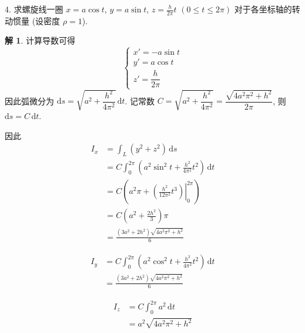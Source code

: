 \documentclass[a4paper,12pt]{article}
\theoremstyle{definition}
\newtheorem*{sol}{解}
\begin{document}
4. 求螺旋线一圈 $x = a\cos t$, $y = a\sin t$, $z = \frac{h}{2\pi}t$ $(0 \leq t \leq 2\pi)$ 对于各坐标轴的转动惯量 (设密度 $\rho = 1$).
\begin{sol}
    计算导数可得
    $$
        \begin{cases}
            x' = -a\sin t \\
            y' = a\cos t  \\
            z' = \dfrac{h}{2\pi}
        \end{cases}
    $$
    因此弧微分为 $\mathrm{d}s = \sqrt{a^2 + \dfrac{h^2}{4\pi^2}} \, \mathrm{d}t$. 记常数 $C = \sqrt{a^2 + \dfrac{h^2}{4\pi^2}} = \dfrac{\sqrt{4a^2\pi^2 + h^2}}{2\pi}$, 则 $\mathrm{d}s = C \, \mathrm{d}t$.

    因此
    \begin{align*}
        I_x & = \int_L (y^2 + z^2) \, \mathrm{d}s                                                   \\
            & = C \int_0^{2\pi} \left( a^2\sin^2 t + \frac{h^2}{4\pi^2}t^2 \right) \, \mathrm{d}t                   \\
            & = C \left( a^2\pi + \left. \left( \frac{h^2}{12\pi^2}t^3 \right) \right|_0^{2\pi} \right) \\
            & = C \left( a^2 + \frac{2h^2}{3} \right) \pi                                            \\
            & = \frac{(3a^2 + 2h^2)\sqrt{4a^2\pi^2 + h^2}}{6}
    \end{align*}

    \begin{align*}
        I_y & = C \int_0^{2\pi} \left( a^2\cos^2 t + \frac{h^2}{4\pi^2}t^2 \right) \, \mathrm{d}t \\
            & = \frac{(3a^2 + 2h^2)\sqrt{4a^2\pi^2 + h^2}}{6}
    \end{align*}

    \begin{align*}
        I_z & = C \int_0^{2\pi} a^2 \, \mathrm{d}t \\
            & = a^2\sqrt{4a^2\pi^2 + h^2}
    \end{align*}
\end{sol}
\end{document}
